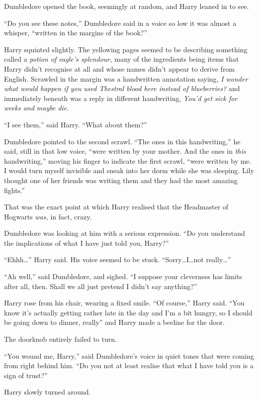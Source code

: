 Dumbledore opened the book, seemingly at random, and Harry leaned in to see.

“Do you see these notes,” Dumbledore said in a voice so low it was almost a whisper, “written in the margins of the book?”

Harry squinted slightly. The yellowing pages seemed to be describing something called a \emph{potion of eagle’s splendour,} many of the ingredients being items that Harry didn’t recognise at all and whose names didn’t appear to derive from English. Scrawled in the margin was a handwritten annotation saying, \emph{I wonder what would happen if you used Thestral blood here instead of blueberries?} and immediately beneath was a reply in different handwriting, \emph{You’d get sick for weeks and maybe die.}

“I see them,” said Harry. “What about them?”

Dumbledore pointed to the second scrawl. “The ones in this handwriting,” he said, still in that low voice, “were written by your mother. And the ones in \emph{this} handwriting,” moving his finger to indicate the first scrawl, “were written by me. I would turn myself invisible and sneak into her dorm while she was sleeping. Lily thought one of her friends was writing them and they had the most amazing fights.”

That was the exact point at which Harry realised that the Headmaster of Hogwarts \emph{was,} in fact, crazy.

Dumbledore was looking at him with a serious expression. “Do you understand the implications of what I have just told you, Harry?”

“Ehhh…” Harry said. His voice seemed to be stuck. “Sorry…I…not really…”

“Ah well,” said Dumbledore, and sighed. “I suppose your cleverness has limits after all, then. Shall we all just pretend I didn’t say anything?”

Harry rose from his chair, wearing a fixed smile. “Of course,” Harry said. “You know it’s actually getting rather late in the day and I’m a bit hungry, so I should be going down to dinner, really” and Harry made a beeline for the door.

The doorknob entirely failed to turn.

“You wound me, Harry,” said Dumbledore’s voice in quiet tones that were coming from right behind him. “Do you not at least realise that what I have told you is a sign of trust?”

Harry slowly turned around.

